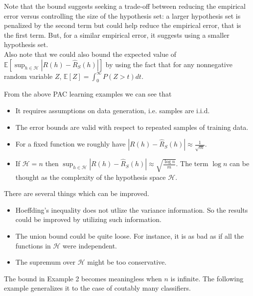 Note that the bound suggests seeking a trade-off between reducing the empirical error versus controlling the size of the hypothesis set: a larger hypothesis set is penalized by the second term but could help reduce the empirical error, that is the first term. But, for a similar empirical error, it suggests using a smaller hypothesis set.\\


Also note that we could also bound the expected value of $\mathbb{E}[\sup_{h \in \mathcal{H}} |R(h)-\hat{R}_S(h)|]$ by using the fact that for any nonnegative random variable $Z$, $\mathbb{E}[Z] = \int_{0}^{\infty} P(Z>t)dt$.

From the above PAC learning examples we can see that
\begin{itemize}
	\item It requires assumptions on data generation, i.e. samples are i.i.d.
	\item The error bounds are valid with respect to repeated samples of training data.
	\item For a fixed function we roughly have $|R(h)-\hat{R}_S(h)| \approx \frac{1}{\sqrt{m}}$.
	\item If $\mathcal{H}=n$ then $\sup_{h \in \mathcal{H}} |R(h)-\hat{R}_S(h)| \approx \sqrt{\frac{\log n}{m}}$. The term $\log n$ can be thought as the complexity of the hypothesis space $\mathcal{H}$.
\end{itemize}

There are several things which can be improved.
\begin{itemize}
	\item 	Hoeffding's inequality does not utlize the variance information. So the results could be improved by
	utilizing such information.
	\item The union bound could be quite loose. For instance, it is as bad as if all the functions in $\mathcal{H}$ were independent.
	\item 	The supremum over $\mathcal{H}$ might be too conservative.
\end{itemize}

The bound in Example 2 becomes meaningless when $n$ is infinite. The following example generalizes it to the case of coutably many classifiers.

